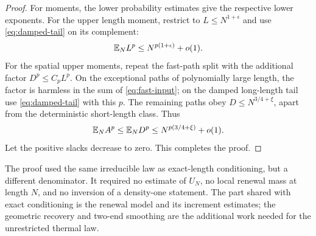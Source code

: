 \begin{proof}
For moments, the lower probability estimates give the respective lower exponents. For the upper length moment, restrict to $L\le N^{1+\epsilon}$ and use \eqref{eq:damped-tail} on its complement:
\[
 \mathbb E_N L^p\le N^{p(1+\epsilon)}+o(1).
\]
For the spatial upper moments, repeat the fast-path split with the additional factor $D^p\le C_pL^p$. On the exceptional paths of polynomially large length, the factor is harmless in the sum of \eqref{eq:fast-input}; on the damped long-length tail use \eqref{eq:damped-tail} with this $p$. The remaining paths obey $D\le N^{3/4+\xi}$, apart from the deterministic short-length class. Thus
\[
 \mathbb E_N A^p\le\mathbb E_N D^p\le N^{p(3/4+\xi)}+o(1).
\]
Let the positive slacks decrease to zero. This completes the proof.
\end{proof}
The proof used the same irreducible law as exact-length conditioning, but a different denominator. It required no estimate of $U_N$, no local renewal mass at length $N$, and no inversion of a density-one statement. The part shared with exact conditioning is the renewal model and its increment estimates; the geometric recovery and two-end smoothing are the additional work needed for the unrestricted thermal law.
